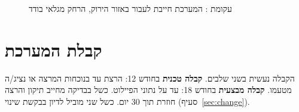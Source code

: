 \begin{figure}[!htb]
\begin{ltrdiagram}

\end{ltrdiagram}
\caption{עקומת : המערכת חייבת לעבור באזור הירוק, הרחק מגלאי בודד}\label{fig:roc}
\end{figure}

\section{קבלת המערכת}
הקבלה נעשית בשני שלבים. \textbf{קבלה טכנית} בחודש \num{12}: הרצת  עד  בנוכחות המרצה או נציג/ה מטעמו. \textbf{קבלה מבצעית} בחודש \num{18}:  עד  על נתוני הפיילוט. כשל בבדיקה מחייב תיקון והרצה חוזרת תוך \num{30} יום. כשל שני מוביל לדיון בבקשת שינוי (סעיף~\ref{sec:change}).
